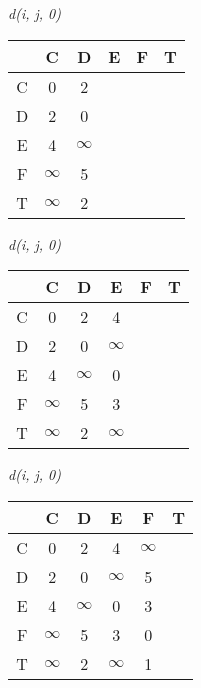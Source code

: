 \begin{frame}{\textit{d(i, j, 0)}}

\centering

\vspace{1em}

\begin{tabular}{c|ccccc}
     & C & D & E & F & T \\
    \hline
    C & 0 & 2\\
    D & 2 & 0\\
   E & 4 & $\infty$ \\
   F & $\infty$ & 5 \\
    T & $\infty$ & 2  \\
\end{tabular}

\vspace{1em}

\end{frame}

\begin{frame}{\textit{d(i, j, 0)}}

\centering

\vspace{1em}

\begin{tabular}{c|ccccc}
     & C & D & E & F & T \\
    \hline
    C & 0 & 2 & 4 \\
    D & 2 & 0 & $\infty$\\
   E & 4 & $\infty$ & 0  \\
   F & $\infty$ & 5 & 3\\
    T & $\infty$ & 2 & $\infty$\\
\end{tabular}

\vspace{1em}

\end{frame}

\begin{frame}{\textit{d(i, j, 0)}}

\centering

\vspace{1em}

\begin{tabular}{c|ccccc}
     & C & D & E & F & T \\
    \hline
     C & 0 & 2 & 4 & $\infty$ \\
   D & 2 & 0 & $\infty$ & 5 \\
    E & 4 & $\infty$ & 0 & 3 \\
   F & $\infty$ & 5 & 3 & 0 \\
   T & $\infty$ & 2 & $\infty$ & 1\\
\end{tabular}

\vspace{1em}

\end{frame}

